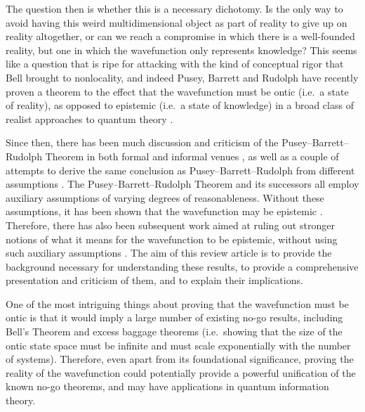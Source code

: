 \documentclass[DIV=calc,fontsize=12pt]{scrartcl} %
\theoremstyle{definition}
\theoremstyle{plain}
\begin{document}
The question then is whether this is a necessary dichotomy.  Is the
only way to avoid having this weird multidimensional object as part of
reality to give up on reality altogether, or can we reach a compromise
in which there is a well-founded reality, but one in which the
wavefunction only represents knowledge?  This seems like a question
that is ripe for attacking with the kind of conceptual rigor that Bell
brought to nonlocality, and indeed Pusey, Barrett and Rudolph have
recently proven a theorem to the effect that the wavefunction must be
ontic (i.e.\ a state of reality), as opposed to epistemic (i.e.\ a
state of knowledge) in a broad class of realist approaches to quantum
theory \cite{Pusey2012}.

Since then, there has been much discussion and criticism of the
Pusey--Barrett--Rudolph Theorem in both formal \cite{Bub2012,
  Bub2012a, Drezet2012, Drezet2012a, Emerson2013, Hall2011,
  Hofmann2011, Mansfield2013, Miller2013, Schlosshauer2013,
  Schlosshauer2012, Wallden2013} and informal venues
\cite{Aaronson2011, Griffiths2012, Leifer2011, Leifer2012a,
  Leifer2011a, Motl2011, Reich2012, Reich2011, Spekkens2012,
  Wallace2011}, as well as a couple of attempts to derive the same
conclusion as Pusey--Barrett--Rudolph from different assumptions
\cite{Colbeck2012, Hardy2013}.  The Pusey--Barrett--Rudolph Theorem
and its successors all employ auxiliary assumptions of varying degrees
of reasonableness.  Without these assumptions, it has been shown that
the wavefunction may be epistemic \cite{Lewis2012}.  Therefore, there
has also been subsequent work aimed at ruling out stronger notions of
what it means for the wavefunction to be epistemic, without using such
auxiliary assumptions \cite{Aaronson2013, Barrett2013, Branciard2014,
  Leifer2013c, Leifer2014, Maroney2012, Maroney2012a, Patra2013a}.
The aim of this review article is to provide the background necessary
for understanding these results, to provide a comprehensive
presentation and criticism of them, and to explain their implications.

One of the most intriguing things about proving that the wavefunction
must be ontic is that it would imply a large number of existing no-go
results, including Bell's Theorem \cite{Bell1964} and excess baggage
theorems \cite{Hardy2004, Montina2008, Montina2011}(i.e.\ showing that
the size of the ontic state space must be infinite and must scale
exponentially with the number of systems).  Therefore, even apart from
its foundational significance, proving the reality of the wavefunction
could potentially provide a powerful unification of the known no-go
theorems, and may have applications in quantum information theory.
\end{document}
